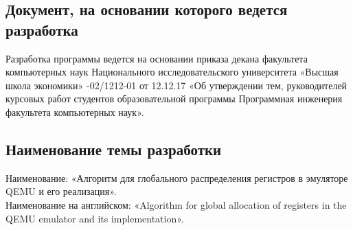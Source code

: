 \subsection{Документ, на основании которого ведется разработка}
Разработка программы ведется на основании приказа декана факультета компьютерных наук  
Национального исследовательского университета «Высшая школа экономики» 
-02/1212-01 от 12.12.17
«Об  утверждении  тем,  руководителей  курсовых  работ  студентов
образовательной  программы  Программная  инженерия 
факультета 
компьютерных наук».


\subsection{Наименование темы разработки}
Наименование: «Алгоритм для глобального распределения регистров в эмуляторе QEMU и его реализация». \\
Наименование на английском: «Algorithm for global allocation of registers in the QEMU emulator and its implementation». \\
